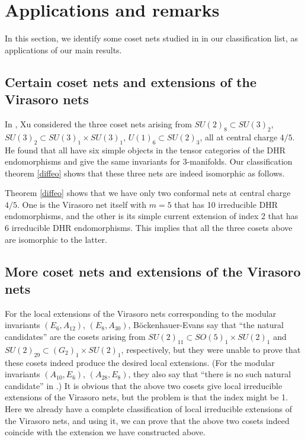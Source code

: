 \documentclass[12pt]{article}
\begin{document}
\section{Applications and remarks}
\label{appl}

In this section, we identify some coset nets studied in \cite{BE,X6}
in our classification list, as applications of our main results.

\subsection{Certain coset nets and extensions of the Virasoro nets}

In \cite[Section 3.7]{X6}, Xu considered the three coset nets 
arising from
$SU(2)_8\subset SU(3)_2$, $SU(3)_2\subset SU(3)_1\times SU(3)_1$,
$U(1)_6\subset SU(2)_3$, all at central charge $4/5$.  He found that
all have six simple objects in the tensor categories of the DHR
endomorphisms and give the same invariants for 3-manifolds. 
Our classification theorem \ref{diffeo} shows that these three
nets are indeed isomorphic as follows.

Theorem \ref{diffeo} shows that we have only two conformal
nets at central charge $4/5$.  One is the Virasoro net itself
with $m=5$ that has 10 irreducible DHR endomorphisms, and the other
is its simple current extension of index 2 that has 6 irreducible
DHR endomorphisms.  This implies that all the three cosets above
are isomorphic to the latter.
\subsection{More coset nets and extensions of the Virasoro nets}

For the local extensions of the Virasoro nets corresponding
to the modular invariants $(E_6, A_{12})$, $(E_8, A_{30})$,
B\"ockenhauer-Evans \cite[II, Subsection 5.2]{BE} say that
``the natural candidates'' are the cosets arising from
$SU(2)_{11}\subset SO(5)_1\times SU(2)_1$ and
$SU(2)_{29}\subset (G_2)_1\times SU(2)_1$, respectively, but
they were unable to prove that these cosets indeed produce
the desired local extensions.  (For the modular invariants
$(A_{10}, E_6)$, $(A_{28}, E_8)$, they also say that ``there
is no such natural candidate'' in \cite[II, Subsection 5.2]{BE}.)
It is obvious that the above
two cosets give local irreducible extensions of the Virasoro
nets, but the problem is that the index might be 1.  Here
we already have a complete classification of local irreducible
extensions of the Virasoro nets, and using it, we can prove
that the above two cosets indeed coincide with the extension
we have constructed above.
\end{document}
